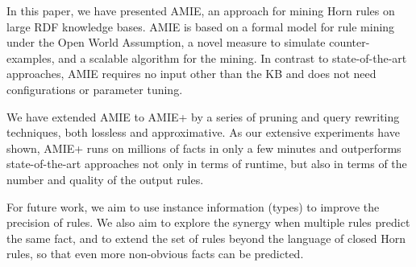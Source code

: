 
In this paper, we have presented AMIE, an approach for mining Horn rules on large RDF knowledge bases. AMIE is based on a formal model for rule mining under the Open World Assumption, a novel measure to simulate counter-examples, and a scalable algorithm for the mining. In contrast to state-of-the-art approaches, AMIE requires no input other than the KB and does not need configurations or parameter tuning.

We have extended AMIE to AMIE+ by a series of pruning and query rewriting techniques, both lossless and approximative.
As our extensive experiments have shown, AMIE+ runs on millions of facts in only a few minutes and outperforms state-of-the-art approaches not only in terms of runtime,
but also in terms of the number and quality of the output rules.

For future work, we aim to use instance information (types) to improve the precision of rules. We also aim to explore the synergy when multiple rules predict the same fact, and to extend the set of rules beyond the language of closed Horn rules,
so that even more non-obvious facts can be predicted.
